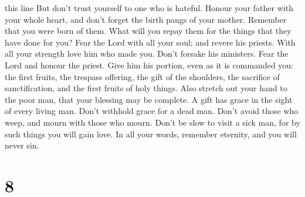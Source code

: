 this line But don't trust yourself to one who is hateful. 
Honour your father with your whole heart, and don't forget the birth
pangs of your mother.  Remember that you were born of them.
What will you repay them for the things that they have done for you?
 Fear the Lord with all your soul; and revere his priests.
 With all your strength love him who made you. Don't
forsake his ministers.  Fear the Lord and honour the
priest. Give him his portion, even as it is commanded you: the first
fruits, the trespass offering, the gift of the shoulders, the sacrifice
of sanctification, and the first fruits of holy things. 
Also stretch out your hand to the poor man, that your blessing may be
complete.  A gift has grace in the sight of every living
man. Don't withhold grace for a dead man.  Don't avoid
those who weep, and mourn with those who mourn.  Don't be
slow to visit a sick man, for by such things you will gain love.
 In all your words, remember eternity, and you will never
sin.

\hypertarget{section-6}{%
\section{8}\label{section-6}}

